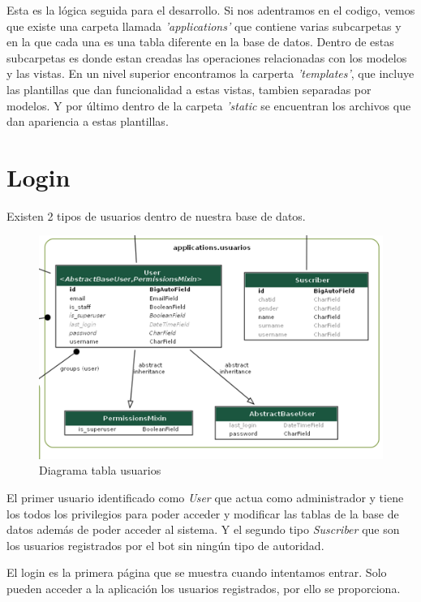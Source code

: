 Esta es la lógica seguida para el desarrollo. Si nos adentramos en el codigo, vemos que existe una carpeta llamada \textit{'applications'} que contiene varias subcarpetas y en la que cada una es una tabla diferente en la base de datos. Dentro de estas subcarpetas es donde estan creadas las operaciones relacionadas con los modelos y las vistas. En un nivel superior encontramos la carperta \textit{'templates'}, que incluye las plantillas que dan funcionalidad a estas vistas, tambien separadas por modelos. Y por último dentro de la carpeta \textit{'static} se encuentran los archivos que dan apariencia a estas plantillas.



\section{Login}

Existen 2 tipos de usuarios dentro de nuestra base de datos.


\begin{figure}[!ht]
    \centering
    \includegraphics[width=1\textwidth]{imagenes/usuarios.png}
    \caption{ Diagrama tabla usuarios }
    \label{fig:enter-label}
\end{figure}
\vspace{1cm}

El primer usuario identificado como \textit{User} que actua como administrador y tiene los todos los privilegios para poder acceder y modificar las tablas de la base de datos además de poder acceder al sistema. Y el segundo tipo \textit{Suscriber} que son los usuarios registrados por el bot sin ningún tipo de autoridad. 

El login es la primera página que se muestra cuando intentamos entrar. Solo pueden acceder a la aplicación los usuarios registrados, por ello se proporciona.

